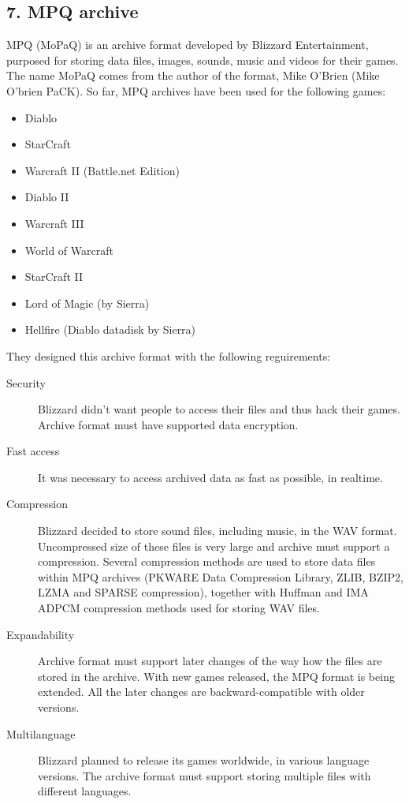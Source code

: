 \documentclass[letterpaper]{article}
\begin{document}
\subsection{7. MPQ archive}
MPQ (MoPaQ) is an archive format developed by Blizzard Entertainment, purposed for storing data files, images, sounds, music and videos for their games. The name MoPaQ comes from the author of the format, Mike O'Brien (Mike O'brien PaCK). So far, MPQ archives have been used for the following games:
\begin{itemize}
	\item Diablo
	\item StarCraft
	\item Warcraft II (Battle.net Edition)
	\item Diablo II
	\item Warcraft III
	\item World of Warcraft
	\item StarCraft II
	\item Lord of Magic (by Sierra)
	\item Hellfire (Diablo datadisk by Sierra)
\end{itemize}

They designed this archive format with the following reguirements:
\begin{description}
	\item[Security] Blizzard didn't want people to access their files and thus hack their games. Archive format must have supported data encryption.
	\item[Fast access] It was necessary to access archived data as fast as possible, in realtime.
	\item[Compression] Blizzard decided to store sound files, including music, in the WAV format. Uncompressed size of these files is very large and archive must support a compression. Several compression methods are used to store data files within MPQ archives (PKWARE Data Compression Library, ZLIB, BZIP2, LZMA and SPARSE compression), together with Huffman and IMA ADPCM compression methods used for storing WAV files.
	\item[Expandability] Archive format must support later changes of the way how the files are stored in the archive. With new games released, the MPQ format is being extended. All the later changes are backward-compatible with older versions.
	\item[Multilanguage] Blizzard planned to release its games worldwide, in various language versions. The archive format must support storing multiple files with different languages.
\end{description}
\end{document}
